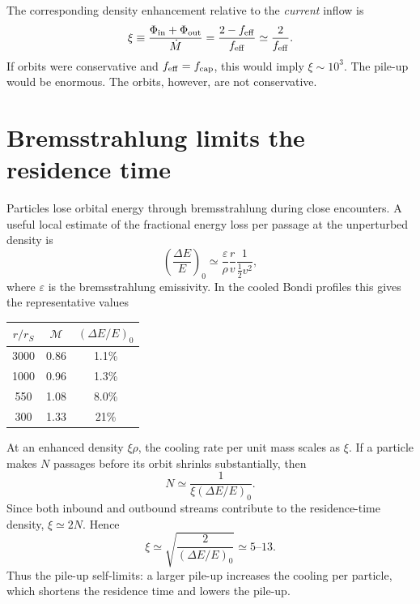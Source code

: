 \documentclass[12pt]{article}
\newcommand{\Mdot}{\dot{M}}
\newcommand{\feff}{f_{\rm eff}}
\begin{document}
The corresponding density enhancement relative to the \emph{current}
inflow is
\begin{equation}
  \xi \equiv \frac{\Phi_{\rm in}+\Phi_{\rm out}}{\Mdot}
  = \frac{2-\feff}{\feff}
  \simeq \frac{2}{\feff}.
  \label{eq:xi_definition_rewrite}
\end{equation}
If orbits were conservative and $\feff=f_{\rm cap}$, this would imply
$\xi\sim10^3$. The pile-up would be enormous. The orbits, however,
are not conservative.

\section{Bremsstrahlung limits the residence time}
\label{app:bremsstrahlung}

Particles lose orbital energy through bremsstrahlung during close
encounters. A useful local estimate of the fractional energy loss per
passage at the unperturbed density is
\begin{equation}
  \left(\frac{\Delta E}{E}\right)_0
  \simeq
  \frac{\varepsilon}{\rho}\frac{r}{v}
  \frac{1}{\tfrac12 v^2},
  \label{eq:dEE_local_rewrite}
\end{equation}
where $\varepsilon$ is the bremsstrahlung emissivity. In the cooled
Bondi profiles this gives the representative values
\begin{center}
\begin{tabular}{ccc}
\toprule
$r/r_S$ & $\mathcal{M}$ & $(\Delta E/E)_0$ \\
\midrule
3000 & 0.86 & 1.1\% \\
1000 & 0.96 & 1.3\% \\
550  & 1.08 & 8.0\% \\
300  & 1.33 & 21\% \\
\bottomrule
\end{tabular}
\end{center}
At an enhanced density $\xi\rho$, the cooling rate per unit mass scales
as $\xi$. If a particle makes $N$ passages before its orbit shrinks
substantially, then
\begin{equation}
  N \simeq \frac{1}{\xi(\Delta E/E)_0}.
\end{equation}
Since both inbound and outbound streams contribute to the residence-time
density, $\xi\simeq2N$. Hence
\begin{equation}
  \xi \simeq
  \sqrt{\frac{2}{(\Delta E/E)_0}}
  \simeq 5\mbox{--}13.
  \label{eq:xi_self_limited_rewrite}
\end{equation}
Thus the pile-up self-limits: a larger pile-up increases the cooling
per particle, which shortens the residence time and lowers the pile-up.
\end{document}
